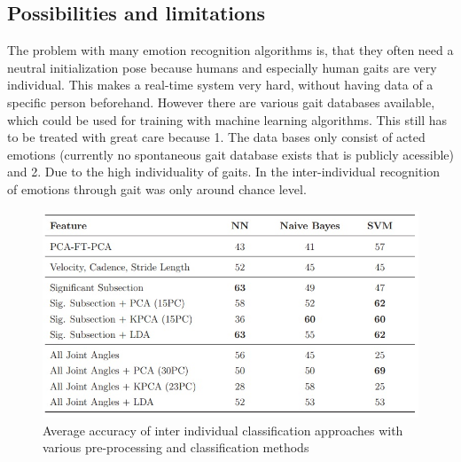 \documentclass[conference]{IEEEtran}
\begin{document}
\subsection{Possibilities and limitations}
The problem with many emotion recognition algorithms is, that they often need a neutral initialization pose\cite{li2016emotion,cui2016emotion} because humans and especially human gaits are very individual. This makes a real-time system very hard, without having data of a specific person beforehand. However there are various gait databases available\cite{wang2008recognizing,karg2009comparison}, which could be used for training with machine learning algorithms. This still has to be treated with great care because 1. The data bases only consist of acted emotions (currently no spontaneous gait database exists that is publicly acessible) and 2. Due to the high individuality of gaits\cite{karg2012pattern,janssen2008recognition}. In \cite{janssen2008recognition} the inter-individual recognition of emotions through gait was only around chance level.

\begin{figure}
\centering
\includegraphics[width=\linewidth]{interIndividualClassification.jpg}
\caption{Average accuracy of inter individual classification approaches with various pre-processing and classification methods\cite{karg2012pattern}}
\label{fig:interIndividualClassification}
\end{figure}
\end{document}
